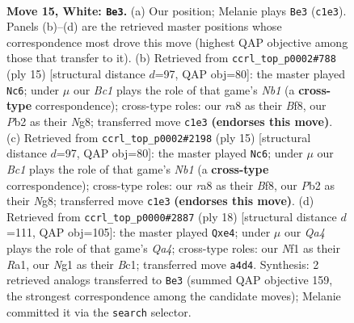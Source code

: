 \documentclass[11pt]{article}
\begin{document}
\clearpage

\begin{figure}[p]\centering
\begin{subfigure}{0.46\textwidth}\centering
\resizebox{\linewidth}{!}{%
\newchessgame
\chessboard[
  setfen={r1bq1k2/pp1n1pp1/4p3/2bpP3/Q2n1P1r/P7/1P4PP/R1B1KNNR w KQ - 3 15},
  showmover=false,
  pgfstyle=straightmove, color=movearrow, markmove={c1-e3}
]}
\caption{}
\end{subfigure}\hfill
\begin{subfigure}{0.46\textwidth}\centering
\resizebox{\linewidth}{!}{%
\newchessgame
\chessboard[
  setfen={rn2kbnr/pp3ppp/4p3/q2p4/3P4/2N2Q1P/PPPB1PP1/R3KB1R b KQkq - 1 8},
  showmover=false,
  pgfstyle=straightmove, color=movearrow, markmove={b8-c6}
]}
\caption{}
\end{subfigure}
\\[4pt]
\begin{subfigure}{0.46\textwidth}\centering
\resizebox{\linewidth}{!}{%
\newchessgame
\chessboard[
  setfen={rn2kbnr/pp3ppp/4p3/q2p4/3P4/2N2Q1P/PPPB1PP1/R3KB1R b KQkq - 1 8},
  showmover=false,
  pgfstyle=straightmove, color=movearrow, markmove={b8-c6}
]}
\caption{}
\end{subfigure}\hfill
\begin{subfigure}{0.46\textwidth}\centering
\resizebox{\linewidth}{!}{%
\newchessgame
\chessboard[
  setfen={r1bqk2r/pppn2pp/3bp3/8/Q3n3/2P2N2/PP3PPP/R1B1KB1R w KQkq - 2 10},
  showmover=false,
  pgfstyle=straightmove, color=movearrow, markmove={a4-e4}
]}
\caption{}
\end{subfigure}
\caption{\textbf{Move 15, White: \texttt{Be3}.} (a) Our position; Melanie plays \texttt{Be3} (\texttt{c1e3}). Panels (b)--(d) are the retrieved master positions whose correspondence most drove this move (highest QAP objective among those that transfer to it). (b) Retrieved from \texttt{ccrl\_top\_p0002\#788} (ply 15) [structural distance $d$=97, QAP obj=80]: the master played \texttt{Nc6}; under $\mu$ our \emph{Bc1} plays the role of that game's \emph{Nb1} (a \textbf{cross-type} correspondence); cross-type roles: our \emph{r}a8 as their \emph{B}f8, our \emph{P}b2 as their \emph{N}g8; transferred move \texttt{c1e3} \textbf{(endorses this move)}. (c) Retrieved from \texttt{ccrl\_top\_p0002\#2198} (ply 15) [structural distance $d$=97, QAP obj=80]: the master played \texttt{Nc6}; under $\mu$ our \emph{Bc1} plays the role of that game's \emph{Nb1} (a \textbf{cross-type} correspondence); cross-type roles: our \emph{r}a8 as their \emph{B}f8, our \emph{P}b2 as their \emph{N}g8; transferred move \texttt{c1e3} \textbf{(endorses this move)}. (d) Retrieved from \texttt{ccrl\_top\_p0000\#2887} (ply 18) [structural distance $d$=111, QAP obj=105]: the master played \texttt{Qxe4}; under $\mu$ our \emph{Qa4} plays the role of that game's \emph{Qa4}; cross-type roles: our \emph{N}f1 as their \emph{R}a1, our \emph{N}g1 as their \emph{B}c1; transferred move \texttt{a4d4}. Synthesis: 2 retrieved analogs transferred to \texttt{Be3} (summed QAP objective 159, the strongest correspondence among the candidate moves); Melanie committed it via the \texttt{search} selector.}
\label{fig:thought-m28}
\end{figure}
\end{document}
